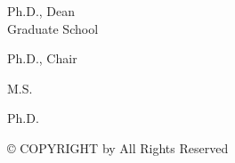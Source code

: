 \begin{titlepage}
{\begin{center}
		\begin{singlespace}
		\gradschooldean{} Ph.D., Dean \\
		Graduate School
		\end{singlespace}
		
		\vskip 11pt
		
		\begin{singlespace}
		\chairname{} Ph.D., Chair \\
		\chairdept
		\end{singlespace}
		
		\vskip 11pt
		
		\begin{singlespace}
		\committeememberonename{} M.S.\\
		\committeememberonedept
		\end{singlespace}
		
		\vskip 11pt
		
		\begin{singlespace}
		\committeemembertwoname{} Ph.D.\\
		\committeemembertwodept
		\end{singlespace}
		
		\end{center}
		\vfill
		\vspace{14pt}
		\vfill
	} %
\end{titlepage}

\chaptertitle



\vspace*{\fill}
\begin{center}
\begin{singlespace}


\copyright{} COPYRIGHT
\vskip 11pt
by
\vskip 11pt
\me
\vskip 11pt
\mygradyear
\vskip 11pt
All Rights Reserved

\end{singlespace}
\end{center}
\vspace*{\fill}
\newpage
 

